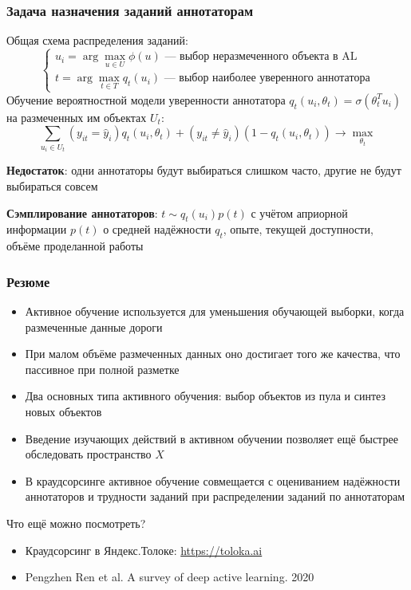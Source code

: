 \documentclass[fullscreen=true, bookmarks=true, hyperref={pdfencoding=unicode}]{beamer}
\begin{document}
\begin{frame}
  \frametitle{Задача назначения заданий аннотаторам}

  Общая схема распределения заданий:
  $$\begin{cases}
    u_i = \arg\max\limits_{u \in U} \phi (u) \text{ — выбор неразмеченного объекта в AL} \\
    t = \arg\max\limits_{t \in T} q_t (u_i) \text{ — выбор наиболее уверенного аннотатора}
  \end{cases}$$
  Обучение вероятностной модели уверенности аннотатора
  $q_t(u_i, \theta_t) = \sigma(\theta_t^Tu_i)$ на размеченных им объектах $U_t$:
  $$ \sum\limits_{u_i \in U_t} (y_{it} = \hat y_{i}) q_t(u_i, \theta_t) +
  (y_{it} \neq \hat y_{i})(1 - q_t(u_i, \theta_t)) \to \max\limits_{\theta_t} $$

  {\bf Недостаток}: одни аннотаторы будут выбираться слишком
  часто, другие не будут выбираться совсем

  {\bf Сэмплирование аннотаторов}: $t \sim q_t(u_i)p(t)$ с учётом
  априорной информации $p(t)$ о средней надёжности $q_t$, опыте,
  текущей доступности, объёме проделанной работы

\end{frame}

\begin{frame}[t]
  \frametitle{Резюме}

  \begin{itemize}
    \item Активное обучение используется для уменьшения
    обучающей выборки, когда размеченные данные дороги
    \item При малом объёме размеченных данных оно достигает
    того же качества, что пассивное при полной разметке
    \item Два основных типа активного обучения:
    выбор объектов из пула и синтез новых объектов
    \item Введение изучающих действий в активном обучении
    позволяет ещё быстрее обследовать пространство $X$
    \item В краудсорсинге активное обучение совмещается
    с оцениванием надёжности аннотаторов и трудности
    заданий при распределении заданий по аннотаторам
  \end{itemize}

  \vspace{0.25cm}
  \pause
  Что ещё можно посмотреть?

  \begin{itemize}
    \item Краудсорсинг в Яндекс.Толоке: \href{https://toloka.ai}{https://toloka.ai}
    \item Pengzhen Ren et al. A survey of deep active learning. 2020
  \end{itemize}
\end{frame}
\end{document}

